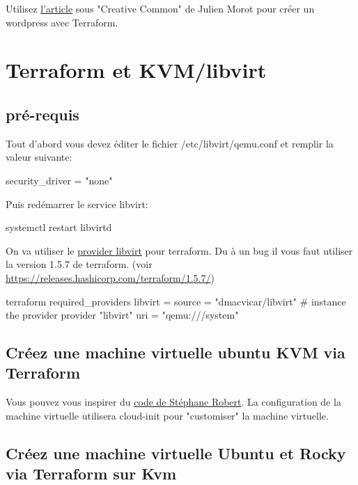 Utilisez \href{https://connect.ed-diamond.com/GNU-Linux-Magazine/glmf-240/utilisez-terraform-pour-vos-projets-docker}{l'article} sous "Creative Common" de Julien Morot pour créer un wordpress avec Terraform.


\section{Terraform et KVM/libvirt}

\subsection{pré-requis}
Tout d'abord vous devez éditer le fichier /etc/libvirt/qemu.conf et remplir la valeur suivante:
\begin{textcode}
security_driver = "none"
\end{textcode}
Puis redémarrer le service libvirt:
\begin{bashcode}
systemctl restart libvirtd
\end{bashcode}

On va utiliser le \href{https://registry.terraform.io/providers/dmacvicar/libvirt/latest}{provider libvirt} pour terraform.
Du à un bug il vous faut utiliser la version 1.5.7 de terraform. (voir \url{https://releases.hashicorp.com/terraform/1.5.7/})

\begin{terraformcode}
terraform {
  required_providers {
    libvirt = {
      source = "dmacvicar/libvirt"
    }
  }
  # instance the provider
  provider "libvirt" {
    uri = "qemu:///system"
  }
}

\end{terraformcode}

\subsection{Créez une machine virtuelle ubuntu KVM via Terraform}

Vous pouvez vous inspirer du \href{https://blog.stephane-robert.info/post/terraform-provider-libvirt} {code de Stéphane Robert}.
La configuration de la machine virtuelle utilisera cloud-init pour "customiser"  la machine virtuelle.


\subsection{Créez une machine virtuelle Ubuntu et Rocky via Terraform sur Kvm}

